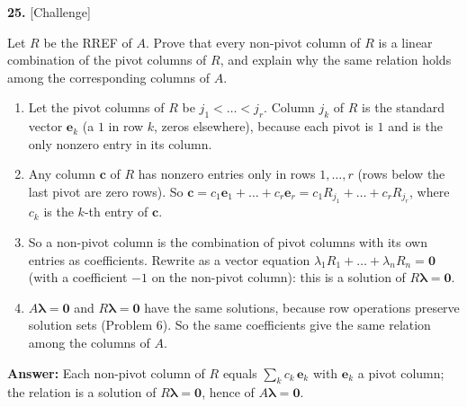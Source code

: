\documentclass[11pt]{article}
\begin{document}
\par\vspace{2pt}
\begin{minipage}{\linewidth}\textbf{25.} \hfill{\scriptsize\color{ink}[Challenge]}\par\nopagebreak Let $R$ be the RREF of $A$. Prove that every non-pivot column of $R$ is a linear combination of the pivot columns of $R$, and explain why the same relation holds among the corresponding columns of $A$.
\end{minipage}\par\nopagebreak
\begin{tcolorbox}[breakable,colback=ans,colframe=ansb,boxrule=0.5pt,left=4pt,right=4pt,top=2pt,bottom=2pt]\begin{enumerate}[leftmargin=2.2em,itemsep=1pt,topsep=1pt,label=\textbf{Step \arabic*.}]\item Let the pivot columns of $R$ be $j_1<\dots<j_r$. Column $j_k$ of $R$ is the standard vector $\mathbf e_k$ (a $1$ in row $k$, zeros elsewhere), because each pivot is $1$ and is the only nonzero entry in its column.
\item Any column $\mathbf c$ of $R$ has nonzero entries only in rows $1,\dots,r$ (rows below the last pivot are zero rows). So $\mathbf c=c_1\mathbf e_1+\dots+c_r\mathbf e_r=c_1R_{j_1}+\dots+c_rR_{j_r}$, where $c_k$ is the $k$-th entry of $\mathbf c$.
\item So a non-pivot column is the combination of pivot columns with its own entries as coefficients. Rewrite as a vector equation $\lambda_1 R_{1}+\dots+\lambda_n R_{n}=\mathbf 0$ (with a coefficient $-1$ on the non-pivot column): this is a solution of $R\boldsymbol\lambda=\mathbf 0$.
\item $A\boldsymbol\lambda=\mathbf 0$ and $R\boldsymbol\lambda=\mathbf 0$ have the same solutions, because row operations preserve solution sets (Problem 6). So the same coefficients give the same relation among the columns of $A$.
\end{enumerate}\textbf{Answer:} Each non-pivot column of $R$ equals $\sum_k c_k\,\mathbf e_k$ with $\mathbf e_k$ a pivot column; the relation is a solution of $R\boldsymbol\lambda=\mathbf 0$, hence of $A\boldsymbol\lambda=\mathbf 0$.\end{tcolorbox}
\par\vspace{2pt}
\end{document}
